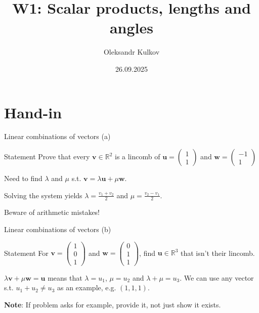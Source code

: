 \documentclass[10pt]{beamer}
\title{W1: Scalar products, lengths and angles}
\date{26.09.2025}
\author{Oleksandr Kulkov}
\institute{ETH Zürich}
\begin{document}
\maketitle

\section{Hand-in}
\begin{frame}{Linear combinations of vectors (a)}
    \begin{block}{Statement}
        Prove that every $\mathbf v \in \mathbb R^2$ is a lincomb of $\mathbf u = \begin{pmatrix}1 \\ 1\end{pmatrix}$ and $\mathbf w =\begin{pmatrix}-1 \\ 1\end{pmatrix}$
    \end{block}
    Need to find $\lambda$ and $\mu$ s.t. $\mathbf v = \lambda \mathbf u + \mu \mathbf w$.

    Solving the system yields $\lambda = \frac{v_1+v_2}{2}$ and $\mu=\frac{v_2-v_1}{2}$.
    
    Beware of arithmetic mistakes!
\end{frame}

\begin{frame}{Linear combinations of vectors (b)}
    \begin{block}{Statement}
        For $\mathbf v = \begin{pmatrix}1 \\ 0 \\ 1\end{pmatrix}$ and $\mathbf w = \begin{pmatrix}0 \\ 1 \\ 1\end{pmatrix}$, find $\mathbf u \in \mathbb R^3$ that isn't their lincomb.
    \end{block}
    $\lambda \mathbf v + \mu \mathbf w = \mathbf u$ means that $\lambda = u_1$, $\mu = u_2$ and $\lambda+\mu = u_3$. We can use any vector s.t. $u_1+u_2 \neq u_3$ as an example, e.g. $(1, 1, 1)$.

    \textbf{Note}: If problem asks for example, provide it, not just show it exists.
\end{frame}
\end{document}
